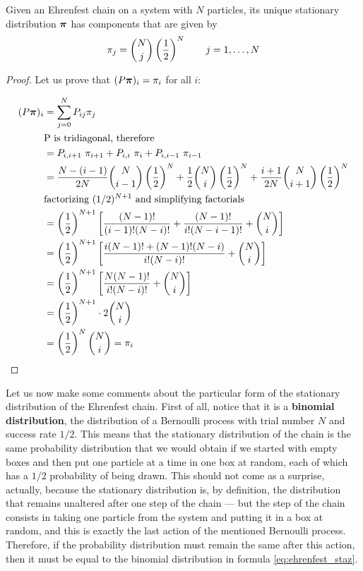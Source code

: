 \begin{theorem}
    Given an Ehrenfest chain on a system with $N$ particles, its unique stationary distribution $\boldsymbol{\pi}$ has components that are given by
    \begin{equation} \label{eq:ehrenfest_staz}
        \pi_j = {{N} \choose {j}} \left(\frac{1}{2} \right)^{N} \quad \quad j = 1,\dots, N
    \end{equation}
\end{theorem}
\begin{proof}
    Let us prove that $(P \boldsymbol{\pi})_i =\pi_i$ for all $i$:

        \begin{align}
            (P \boldsymbol{\pi})_i 
            & =  \sum_{j = 0}^N P_{ij} \pi_j \\
            & \text{P is tridiagonal, therefore} \\ 
            & = P_{i,i+1}~\pi_{i+1} + P_{i,i}~\pi_i + P_{i,i-1}~\pi_{i-1}\\
            & = \frac{N-(i-1)}{2N} {{N} \choose {i-1}} \left(\frac{1}{2} \right)^{N} + \frac{1}{2} {{N} \choose {i}} \left(\frac{1}{2} \right)^{N} + \frac{i+1}{2N} {{N} \choose {i+1}} \left(\frac{1}{2} \right)^{N} \\
            & \text{factorizing $(1/2)^{N+1}$ and simplifying factorials} \\
            & = \left(\frac{1}{2} \right)^{N+1} \left[ \frac{(N-1)!}{(i-1)! (N-i)!} + \frac{(N-1)!}{i! (N-i-1)!} + {{N} \choose {i}} \right]\\
            & = \left(\frac{1}{2} \right)^{N+1} \left[ \frac{i (N-1)! + (N-1)! (N-i)}{i! (N-i)!} + {{N} \choose {i}} \right] \\
            & = \left(\frac{1}{2} \right)^{N+1} \left[ \frac{N (N-1)!}{i! (N-i)!} + {{N} \choose {i}} \right] \\
            & = \left(\frac{1}{2} \right)^{N+1} \cdot 2 {{N} \choose {i}}\\
            & = \left(\frac{1}{2} \right)^{N} {{N} \choose {i}} = \pi_i 
        \end{align}
\end{proof}


Let us now make some comments about the particular form of the stationary distribution of the Ehrenfest chain. First of all, notice that it is a \textbf{binomial distribution}, \ie the distribution of a Bernoulli process with trial number $N$ and success rate $1/2$. This means that the stationary distribution of the chain is the same probability distribution that we would obtain if we started with empty boxes and then put one particle at a time in one box at random, each of which has a $1/2$ probability of being drawn. This should not come as a surprise, actually, because the stationary distribution is, by definition, the distribution that remains unaltered after one step of the chain --- but the step of the chain consists in taking one particle from the system and putting it in a box at random, and this is exactly the last action of the mentioned Bernoulli process. Therefore, if the probability distribution must remain the same after this action, then it must be equal to the binomial distribution in formula \ref{eq:ehrenfest_staz}.

